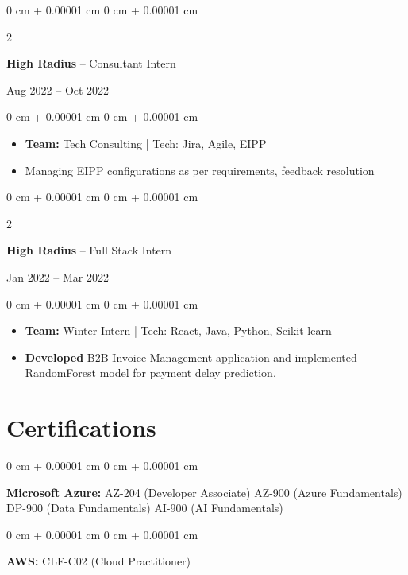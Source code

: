 \documentclass[10pt, letterpaper]{article}
\newenvironment{highlights}{
    \begin{itemize}[
        topsep=0.10 cm,
        parsep=0.10 cm,
        partopsep=0pt,
        itemsep=0pt,
        leftmargin=0 cm + 10pt
    ]
}{
    \end{itemize}
} %
\newenvironment{onecolentry}{
    \begin{adjustwidth}{
        0 cm + 0.00001 cm
    }{
        0 cm + 0.00001 cm
    }
}{
    \end{adjustwidth}
} %
\newenvironment{twocolentry}[2][]{
    \onecolentry
    \def\secondColumn{#2}
    \setcolumnwidth{\fill, 4.5 cm}
    \begin{paracol}{2}
}{
    \switchcolumn \raggedleft \secondColumn
    \end{paracol}
    \endonecolentry
} %
\begin{document}
    \vspace{0.2cm}

     \begin{twocolentry}{Aug 2022 – Oct 2022}
        \textbf{High Radius} -- Consultant Intern
    \end{twocolentry}
    \begin{onecolentry}
        \begin{highlights}
            \item \textbf{Team:} Tech Consulting | Tech: Jira, Agile, EIPP
            \item Managing EIPP configurations as per requirements, feedback resolution
        \end{highlights}
    \end{onecolentry}
    
    \vspace{0.2cm}

    \begin{twocolentry}{Jan 2022 – Mar 2022}
        \textbf{High Radius} -- Full Stack Intern
    \end{twocolentry}
    \begin{onecolentry}
        \begin{highlights}
            \item \textbf{Team:} Winter Intern | Tech: React, Java, Python, Scikit-learn
            \item \textbf{Developed} B2B Invoice Management application and implemented RandomForest model for payment delay prediction.
        \end{highlights}
    \end{onecolentry}

    \vspace{0.2cm}

    \section{Certifications}

    \begin{onecolentry}
        \textbf{Microsoft Azure:} AZ-204 (Developer Associate) {  }\AND{  } AZ-900 (Azure Fundamentals) {  }\AND{  } DP-900 (Data Fundamentals) {  }\AND{  } AI-900 (AI Fundamentals)
    \end{onecolentry}

    \vspace{0.1cm}

    \begin{onecolentry}
        \textbf{AWS:} CLF-C02 (Cloud Practitioner) %
    \end{onecolentry}
\end{document}
